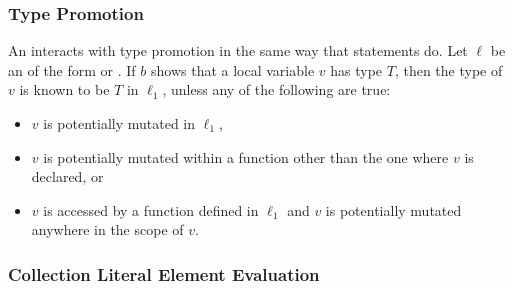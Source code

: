 \documentclass[makeidx]{article}
\begin{document}
{%


\subsubsection{Type Promotion}

\LMHash{}%
An  interacts with type promotion
in the same way that \IF{} statements do.
Let $\ell$ be an  of the form
 or
.
If $b$ shows that a local variable $v$ has type $T$, then
the type of $v$ is known to be $T$ in $\ell_1$,
unless any of the following are true:

\begin{itemize}
\item $v$ is potentially mutated in $\ell_1$,
\item $v$ is potentially mutated within a function
  other than the one where $v$ is declared, or
\item $v$ is accessed by a function defined in $\ell_1$ and
  $v$ is potentially mutated anywhere in the scope of $v$.
\end{itemize}



\subsubsection{Collection Literal Element Evaluation}

}
\end{document}

